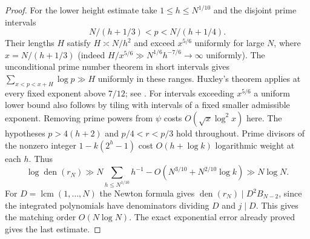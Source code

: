 \documentclass[11pt,a4paper,oneside,openany]{report}
\theoremstyle{remark}\newtheorem{remark}[theorem]{Remark}
\numberwithin{equation}{section}
\begin{document}
\begin{proof}
For the lower height estimate take $1\le h\le N^{1/10}$ and the disjoint prime intervals
\[
 N/(h+1/3)<p<N/(h+1/4).
\]
Their lengths $H$ satisfy $H\asymp N/h^2$ and exceed $x^{5/6}$ uniformly for large $N$, where $x=N/(h+1/3)$ (indeed $H/x^{5/6}\gg N^{1/6}h^{-7/6}\to\infty$ uniformly). The unconditional prime number theorem in short intervals gives $\sum_{x<p<x+H}\log p\gg H$ uniformly in these ranges. Huxley's theorem applies at every fixed exponent above $7/12$; see \cite[p.~84]{baz}. For intervals exceeding $x^{5/6}$ a uniform lower bound also follows by tiling with intervals of a fixed smaller admissible exponent. Removing prime powers from $\psi$ costs $O(\sqrt{x}\log^2 x)$ here. The hypotheses $p>4(h+2)$ and $p/4<r<p/3$ hold throughout. Prime divisors of the nonzero integer $1-k(2^h-1)$ cost $O(h+\log k)$ logarithmic weight at each $h$. Thus
\[
 \log\operatorname{den}(r_N)\gg N\sum_{h\le N^{1/10}}h^{-1}
       -O\!\left(N^{3/10}+N^{2/10}\log k\right)\gg N\log N.
\]
For $D=\operatorname{lcm}(1,\ldots,N)$ the Newton formula gives $\operatorname{den}(r_N)\mid D^2B_{N-2}$, since the integrated polynomials have denominators dividing $D$ and $j\mid D$. This gives the matching order $O(N\log N)$. The exact exponential error already proved gives the last estimate.
\end{proof}
\end{document}
